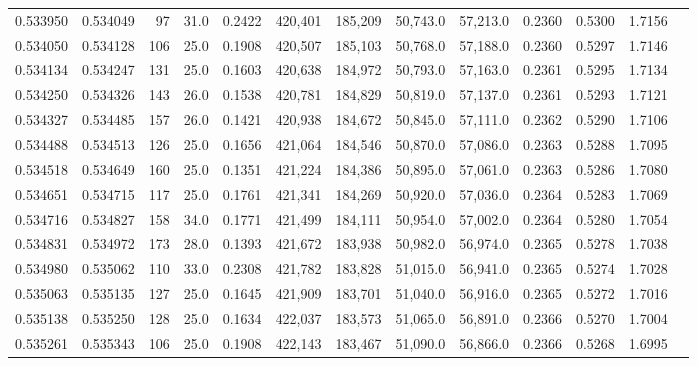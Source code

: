 \begin{tabular}{rrrrrrrrrrrrr}
0.533950 & 0.534049 &    97 & 31.0 &                                     0.2422 & 420,401 & 185,209 &  50,743.0 &  57,213.0 & 0.2360 & 0.5300 & 1.7156 \\
0.534050 & 0.534128 &   106 & 25.0 &                                     0.1908 & 420,507 & 185,103 &  50,768.0 &  57,188.0 & 0.2360 & 0.5297 & 1.7146 \\
0.534134 & 0.534247 &   131 & 25.0 &                                     0.1603 & 420,638 & 184,972 &  50,793.0 &  57,163.0 & 0.2361 & 0.5295 & 1.7134 \\
0.534250 & 0.534326 &   143 & 26.0 &                                     0.1538 & 420,781 & 184,829 &  50,819.0 &  57,137.0 & 0.2361 & 0.5293 & 1.7121 \\
0.534327 & 0.534485 &   157 & 26.0 &                                     0.1421 & 420,938 & 184,672 &  50,845.0 &  57,111.0 & 0.2362 & 0.5290 & 1.7106 \\
0.534488 & 0.534513 &   126 & 25.0 &                                     0.1656 & 421,064 & 184,546 &  50,870.0 &  57,086.0 & 0.2363 & 0.5288 & 1.7095 \\
0.534518 & 0.534649 &   160 & 25.0 &                                     0.1351 & 421,224 & 184,386 &  50,895.0 &  57,061.0 & 0.2363 & 0.5286 & 1.7080 \\
0.534651 & 0.534715 &   117 & 25.0 &                                     0.1761 & 421,341 & 184,269 &  50,920.0 &  57,036.0 & 0.2364 & 0.5283 & 1.7069 \\
0.534716 & 0.534827 &   158 & 34.0 &                                     0.1771 & 421,499 & 184,111 &  50,954.0 &  57,002.0 & 0.2364 & 0.5280 & 1.7054 \\
0.534831 & 0.534972 &   173 & 28.0 &                                     0.1393 & 421,672 & 183,938 &  50,982.0 &  56,974.0 & 0.2365 & 0.5278 & 1.7038 \\
0.534980 & 0.535062 &   110 & 33.0 &                                     0.2308 & 421,782 & 183,828 &  51,015.0 &  56,941.0 & 0.2365 & 0.5274 & 1.7028 \\
0.535063 & 0.535135 &   127 & 25.0 &                                     0.1645 & 421,909 & 183,701 &  51,040.0 &  56,916.0 & 0.2365 & 0.5272 & 1.7016 \\
0.535138 & 0.535250 &   128 & 25.0 &                                     0.1634 & 422,037 & 183,573 &  51,065.0 &  56,891.0 & 0.2366 & 0.5270 & 1.7004 \\
0.535261 & 0.535343 &   106 & 25.0 &                                     0.1908 & 422,143 & 183,467 &  51,090.0 &  56,866.0 & 0.2366 & 0.5268 & 1.6995 \\

\end{tabular}
